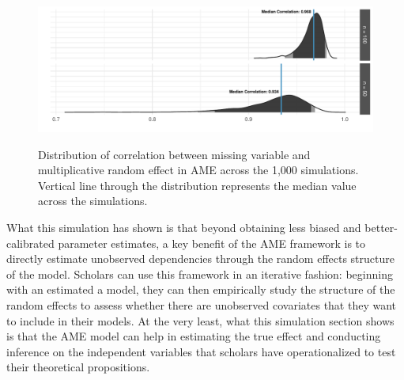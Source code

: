 \begin{figure}
	\centering
	\caption{Distribution of correlation between missing variable and multiplicative random effect in AME across the 1,000 simulations. Vertical line through the distribution represents the median value across the simulations.}
	\label{fig:ameCorr}
	\includegraphics[width=1\textwidth]{graphics/ameSimCorr.pdf} \\
\end{figure}

What this simulation has shown is that beyond obtaining less biased and better-calibrated parameter estimates, a key benefit of the AME framework is to directly estimate unobserved dependencies through the random effects structure of the model. Scholars can use this framework in an iterative fashion: beginning with an estimated a model, they can then empirically study the structure of the random effects to assess whether there are unobserved covariates that they want to include in their models. At the very least, what this simulation section shows is that the AME model can help in estimating the true effect and conducting inference on the independent variables that scholars have operationalized to test their theoretical propositions.
